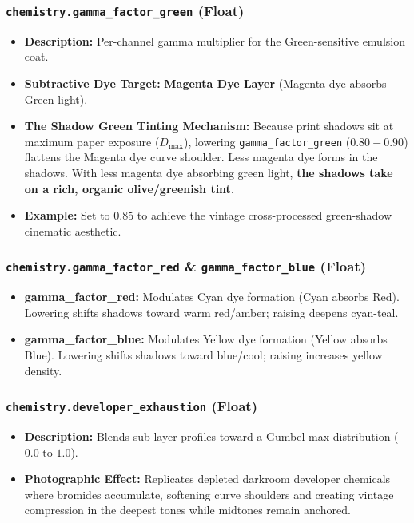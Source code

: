 \documentclass[11pt,a4paper]{article}
\begin{document}
\subsubsection{\texttt{chemistry.gamma\_factor\_green} (Float)}
\begin{itemize}[leftmargin=*]
    \item \textbf{Description:} Per-channel gamma multiplier for the Green-sensitive emulsion coat.
    \item \textbf{Subtractive Dye Target:} \textbf{Magenta Dye Layer} (Magenta dye absorbs Green light).
    \item \textbf{The Shadow Green Tinting Mechanism:}
    Because print shadows sit at maximum paper exposure ($D_{\max}$), lowering \texttt{gamma\_factor\_green} ($0.80 - 0.90$) flattens the Magenta dye curve shoulder. Less magenta dye forms in the shadows. With less magenta dye absorbing green light, \textbf{the shadows take on a rich, organic olive/greenish tint}.
    \item \textbf{Example:} Set to $0.85$ to achieve the vintage cross-processed green-shadow cinematic aesthetic.
\end{itemize}

\subsubsection{\texttt{chemistry.gamma\_factor\_red} \& \texttt{gamma\_factor\_blue} (Float)}
\begin{itemize}[leftmargin=*]
    \item \textbf{gamma\_factor\_red:} Modulates Cyan dye formation (Cyan absorbs Red). Lowering shifts shadows toward warm red/amber; raising deepens cyan-teal.
    \item \textbf{gamma\_factor\_blue:} Modulates Yellow dye formation (Yellow absorbs Blue). Lowering shifts shadows toward blue/cool; raising increases yellow density.
\end{itemize}

\subsubsection{\texttt{chemistry.developer\_exhaustion} (Float)}
\begin{itemize}[leftmargin=*]
    \item \textbf{Description:} Blends sub-layer profiles toward a Gumbel-max distribution ($0.0$ to $1.0$).
    \item \textbf{Photographic Effect:} Replicates depleted darkroom developer chemicals where bromides accumulate, softening curve shoulders and creating vintage compression in the deepest tones while midtones remain anchored.
\end{itemize}
\end{document}
